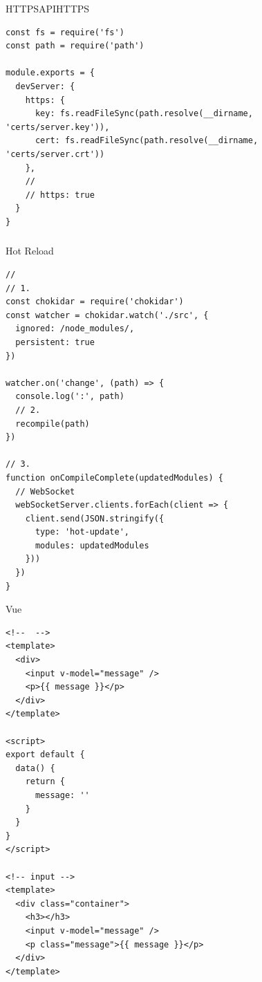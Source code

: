 
HTTPSAPIHTTPS

\begin{lstlisting}[style=javascript]
const fs = require('fs')
const path = require('path')

module.exports = {
  devServer: {
    https: {
      key: fs.readFileSync(path.resolve(__dirname, 'certs/server.key')),
      cert: fs.readFileSync(path.resolve(__dirname, 'certs/server.crt'))
    },
    // 
    // https: true
  }
}
\end{lstlisting}

\hypertarget{section-42}{%
\subsubsection{}\label{section-42}}

Hot Reload

\important{}

\important{}

\important{}

\important{}


\begin{lstlisting}[style=javascript]
// 
// 1. 
const chokidar = require('chokidar')
const watcher = chokidar.watch('./src', {
  ignored: /node_modules/,
  persistent: true
})

watcher.on('change', (path) => {
  console.log(':', path)
  // 2. 
  recompile(path)
})

// 3. 
function onCompileComplete(updatedModules) {
  // WebSocket
  webSocketServer.clients.forEach(client => {
    client.send(JSON.stringify({
      type: 'hot-update',
      modules: updatedModules
    }))
  })
}
\end{lstlisting}


Vue

\important{}

\begin{lstlisting}
<!--  -->
<template>
  <div>
    <input v-model="message" />
    <p>{{ message }}</p>
  </div>
</template>

<script>
export default {
  data() {
    return {
      message: ''
    }
  }
}
</script>

<!-- input -->
<template>
  <div class="container">
    <h3></h3>
    <input v-model="message" />
    <p class="message">{{ message }}</p>
  </div>
</template>
\end{lstlisting}

